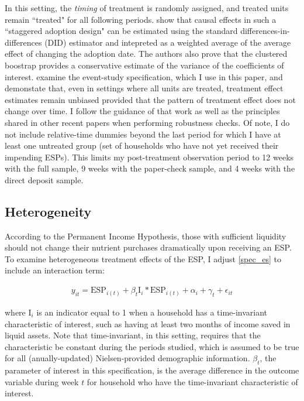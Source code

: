 \documentclass[12pt]{article}
\begin{document}
In this setting, the \textit{timing} of treatment is randomly assigned, and treated units remain ``treated" for all following periods.
\textcite{athey2021design} show that causal effects in such a ``staggered adoption design" can be estimated using the standard differences-in-differences (DID) estimator and intepreted as a weighted average of the average effect of changing the adoption date.
The authors also prove that the clustered boostrap provides a conservative estimate of the variance of the coefficients of interest.
\textcite{sun2020estimating} examine the event-study specification, which I use in this paper, and demonstate that, even in settings where all units are treated, treatment effect estimates remain unbiased provided that the pattern of treatment effect does not change over time.
I follow the guidance of that work as well as the principles shared in other recent papers \parencite{goodman2018difference, callaway2020difference, de2020two} when performing robustness checks.
Of note, I do not include relative-time dummies beyond the last period for which I have at least one untreated group (set of households who have not yet received their impending ESPs).
This limits my post-treatment observation period to 12 weeks with the full sample, 9 weeks with the paper-check sample, and 4 weeks with the direct deposit sample.

\subsection{Heterogeneity}

According to the Permanent Income Hypothesis, those with sufficient liquidity should not change their nutrient purchases dramatically upon receiving an ESP.
To examine heterogeneous treatment effects of the ESP, I adjust \ref{spec_es} to include an interaction term:

\begin{align}
	y_{it} = \text{ESP}_{i(t)} + \beta_t \text{I}_{i} * \text{ESP}_{i(t)} + \alpha_i + \gamma_t + \epsilon_{it} \label{spec_het}
\end{align}

where $\text{I}_{i}$ is an indicator equal to 1 when a household has a time-invariant characteristic of interest, such as having at least two months of income saved in liquid assets.
Note that time-invariant, in this setting, requires that the characteristic be constant during the periods studied, which is assumed to be true for all (anually-updated) Nielsen-provided demographic information.
$\beta_t$, the parameter of interest in this specification, is the average difference in the outcome variable during week $t$ for household who have the time-invariant characteristic of interest.
\end{document}
